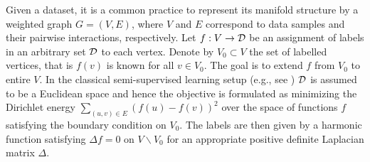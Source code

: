 \documentclass[letterpaper]{article} %
\begin{document}

Given a dataset, it is a common practice to represent its manifold structure by a weighted graph $G=(V, E)$, where $V$ and $E$ correspond to data samples and their pairwise interactions, respectively. Let $f:V\to{\mathcal D}$ be an assignment of labels in an arbitrary set ${\mathcal D}$ to each vertex. Denote by $V_0\subset V$ the set of labelled vertices, that is $f(v)$ is known for all $v\in V_0$. The goal is to extend $f$ from $V_0$ to entire $V$. In the classical semi-supervised learning setup (e.g., see \cite{Zhu:SSL_Gaussian}) ${\mathcal D}$ is assumed to be a Euclidean space and hence the objective is formulated as minimizing the Dirichlet energy $\sum_{(u, v)\in E}(f(u)-f(v))^2$ over the space of functions $f$ satisfying the boundary condition on $V_0$. The labels are then given by a harmonic function satisfying $\Delta f=0$ on $V\backslash V_0$ for an appropriate positive definite Laplacian matrix $\Delta$.   
\end{document}
